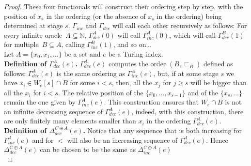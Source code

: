 \documentclass[10pt,a4paper]{amsart}
\newcommand{\NN}[0]{\mathbb{N}}
\begin{document}
\begin{proof}
These four functionals will construct their ordering step by step, with the position of $x_s$ in the ordering (or the absence of $x_s$ in the ordering) being determined at stage $s$. $\Gamma_{inc}$ and $\Gamma_{dec}$ will call each other recursively as follows: For every infinite oracle~$A \subseteq \NN$, $\Gamma^A_{dec}(0)$ will call $\Gamma^A_{inc}(0)$, which will call $\Gamma^B_{dec}(1)$ for multiple~$B \subseteq A$, calling $\Gamma^B_{inc}(1)$, and so on... \\

Let $A = \{x_0, x_1, \dots \}$ be a set and $e$ be a Turing index. \\

\textbf{Definition of $\Gamma^A_{dec}(e)$.}
$\Gamma^A_{dec}(e)$ computes the order $(B, \sqsubseteq_B)$ defined as follows: $\Gamma^A_{dec}(e)$ is the same ordering as $\Gamma^A_{inc}(e)$, but, if at some stage $s$ we have $x_i \in W_e[s] \cap B$ for some $i < s$, then, all the $x_j$ for $j \geq s$ will be bigger than all the $x_i$ for $i < s$. The relative position of the $\{x_0, \dots, x_{s-1}\}$ and of the $\{x_{s}, \dots \}$ remain the one given by $\Gamma^{A}_{inc}(e)$.
This construction ensures that $W_e \cap B$ is not an infinite decreasing sequence of $\Gamma^A_{dec}(e)$, indeed, with this construction, there are only finitely many elements smaller than $x_i$ in the ordering $\Gamma^A_{dec}(e)$. \\

\textbf{Definition of $\Delta^{C \oplus A}_{dec}(e)$.}
Notice that any sequence that is both increasing for $\Gamma_{inc}^A(e)$ and for $<$ will also be an increasing sequence of $\Gamma_{dec}^A(e)$. Hence $\Delta^{C \oplus A}_{dec}(e)$ can be chosen to be the same as $\Delta^{C \oplus A}_{inc}(e)$ \\


\end{proof}
\end{document}
